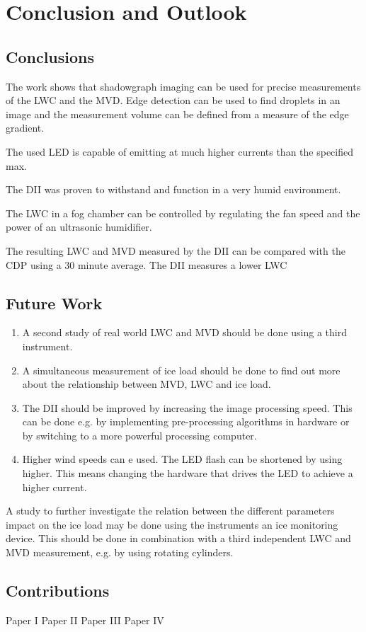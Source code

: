 \chapter{Conclusion and Outlook}
\label{chap:conclusion_outlook}

\section{Conclusions}
The work shows that shadowgraph imaging can be used for precise measurements of the LWC and the MVD. Edge detection can be used to find droplets in an image and the measurement volume can be defined from a measure of the edge gradient.

The used LED is capable of emitting at much higher currents than the specified max.

The DII was proven to withstand and function in a very humid environment. 

The LWC in a fog chamber can be controlled by regulating the fan speed and the power of an ultrasonic humidifier. 


The resulting LWC and MVD measured by the DII can be compared with the CDP using a 30 minute average. The DII measures a lower LWC 

\section{Future Work}

\begin{enumerate}
\item
A second study of real world LWC and MVD should be done using a third instrument. 
\item
A simultaneous measurement of ice load should be done to find out more about the relationship between MVD, LWC and ice load.
\item
The DII should be improved by increasing the image processing speed. This can be done e.g. by implementing pre-processing algorithms in hardware or by switching to a more powerful processing computer.
\item
Higher wind speeds can e used. The LED flash can be shortened by using higher. This means changing the hardware that drives the LED to achieve a higher current.
\end{enumerate}


A study to further investigate the relation between the different parameters impact on the ice load may be done using the instruments an ice monitoring device. This should be done in combination with a third independent LWC and MVD measurement, e.g. by using rotating cylinders\cite{makk1992}.

\section{Contributions}
Paper I
Paper II
Paper III
Paper IV
